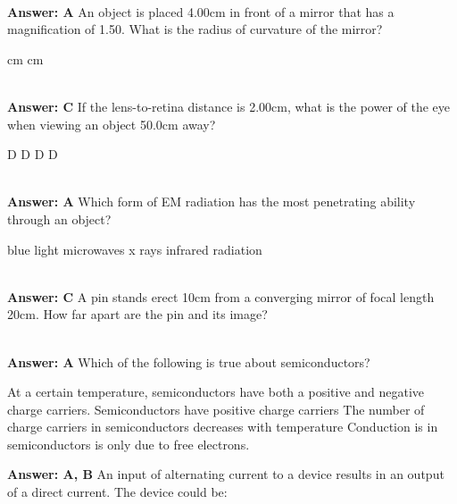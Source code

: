 \documentclass[12pt,addpoints]{exam}
\begin{document}
{{{\begin{questions}
					\\ \textbf{Answer: A}
					\question An object is placed 4.00cm in front of a mirror that has a magnification of 1.50. What is the radius of curvature of the mirror? \\
					\begin{oneparchoices}
						 cm
						\choice -4.8cm
						 cm
						\choice 4.8cm
					\end{oneparchoices}
					\\ \textbf{Answer: C}
					\question If the lens-to-retina distance is  2.00cm, what is the power of the eye when viewing an object  50.0cm
					away?\\
					\begin{oneparchoices}
						\choice 52.0 D
						\choice 1.92 D
						\choice -52.0 D
						\choice 0.52 D
					\end{oneparchoices}
					\\ \textbf{Answer: A}
					\question Which form of EM radiation has the most penetrating ability through an object?\\
					\begin{oneparchoices}
						\choice blue light
						\choice microwaves
						\choice x rays
						\choice infrared radiation
					\end{oneparchoices}
					\\ \textbf{Answer: C}
					\question A pin stands erect 10cm from a converging mirror of focal length 20cm. How far apart are the pin and its image? \\
					\begin{oneparchoices}
						\choice 10cm
						\choice 7cm
						\choice 20cm
						\choice 30cm
					\end{oneparchoices}
					\\ \textbf{Answer: A}
					\question Which of the following is true about semiconductors?
					\begin{choices}
						\choice At a certain temperature, semiconductors have both a positive and negative charge carriers.
						\choice Semiconductors have positive charge carriers
						\choice The number of charge carriers in semiconductors decreases with temperature
						\choice Conduction is in semiconductors is only due to free electrons.
					\end{choices}
					\textbf{Answer: A, B}
					\question An input of alternating current to a device results in an output of a direct current. The device could be: \\
					\begin{oneparchoices}

\end{oneparchoices}
\end{questions}}}}
\end{document}
